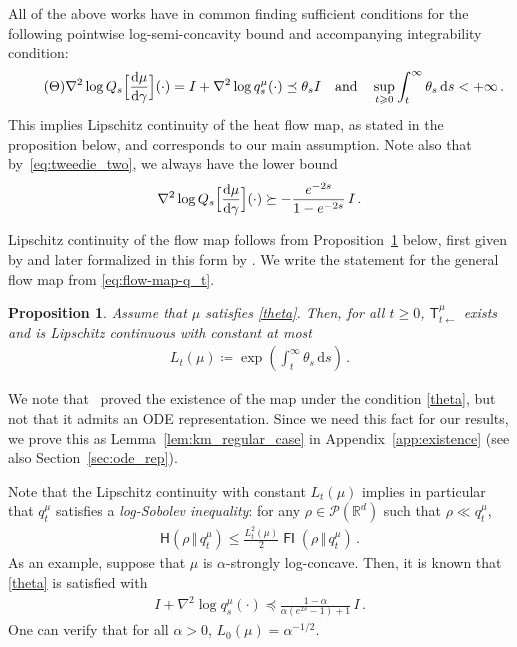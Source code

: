 \documentclass[12pt]{article}
\newcommand{\cP}{\mathcal{P}}
\newcommand{\RR}{\mathbb{R}}
\newcommand{\R}{\RR}
\newcommand{\1}{\mathds{1}}
\newcommand*{\rd}{\mathrm{d}}
\newcommand*{\dd}{\, \rd}
\newcommand{\mmid}{\,\Vert\,}
\newcommand{\deq}{\coloneqq}
\DeclareMathOperator*{\FI}{\mathsf{FI}}
\renewcommand{\ge}{\geqslant}
\renewcommand{\leq}{\leqslant}
\theoremstyle{plain}
\newtheorem{proposition}[theorem]{Proposition}
\theoremstyle{definition}
\theoremstyle{remark}
\begin{document}
All of the above works have in common finding sufficient conditions for the following  pointwise log-semi-concavity bound and accompanying integrability condition:
\begin{align}\label{theta}\tag{$\Theta$}
    \nabla^2 \log Q_s\Bigl[\frac{\!\dd\mu}{\!\dd\gamma}\Bigr](\cdot) = I + \nabla^2 \log q^\mu_s(\cdot) \preceq \theta_s I \quad \text{and}\quad \sup_{t\ge 0}\int_t^\infty \theta_s \dd s < +\infty\,.
\end{align}
This implies Lipschitz continuity of the heat flow map, as stated in the proposition below, and corresponds to our main assumption.
Note also that by~\eqref{eq:tweedie_two}, we always have the lower bound
\begin{align*}
    \nabla^2 \log Q_s\Bigl[\frac{\!\dd\mu}{\!\dd\gamma}\Bigr](\cdot) \succeq -\frac{e^{-2s}}{1-e^{-2s}}\,I\,.
\end{align*}

Lipschitz continuity of the flow map follows from Proposition~\ref{prop:lip_km} below, first given by \cite{kim2012generalization} and later formalized in this form by \citet[Lemma 11]{MikShe23HeatFlow}. We write the statement for the general flow map from \eqref{eq:flow-map-q_t}.

\begin{proposition}\label{prop:lip_km}
Assume that $\mu$ satisfies \eqref{theta}. Then, for all $t \ge 0$, $\mathsf T^{\mu}_{t\gets}$ exists and is Lipschitz continuous with constant at most 
\begin{align}\label{eq:def-L_t}
    L_t(\mu) \deq \exp(\textstyle \int_t^\infty \theta_s \dd s)\,.
\end{align}
\end{proposition}

We note that~\citet{MikShe23HeatFlow} proved the existence of the map {under the condition \eqref{theta}, but not that it admits an ODE representation. Since we need this fact for our results, we prove this as Lemma~\ref{lem:km_regular_case} in Appendix~\ref{app:existence} (see also Section~\ref{sec:ode_rep}).}

Note that the Lipschitz continuity with constant $L_t(\mu)$ implies in particular that $q^\mu_t$ satisfies a \emph{log-Sobolev inequality}: for any $\rho \in \cP(\R^d)$ such that $\rho \ll q_t^\mu$,
\begin{align}\label{eq:lsi}
    \mathsf H(\rho\mmid q_t^\mu) \leq \frac{L_t^2(\mu)}{2} \FI(\rho\mmid q_t^\mu)\,.
\end{align}
As an example, suppose that $\mu$ is $\alpha$-strongly log-concave. Then, it is known that \eqref{theta} is satisfied with~\citep[see, e.g.,][]{MikShe23HeatFlow,BriPed25HeatFlow}
\begin{align}\label{eq:theta_slc}
    I + \nabla^2 \log q_s^\mu(\cdot) \preceq \frac{1-\alpha}{\alpha(e^{2s}-1) + 1}\,I\,.
\end{align}
One can verify that for all $\alpha > 0$, $L_0(\mu) = \alpha^{-1/2}$.
\end{document}
